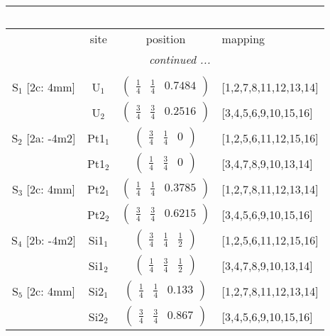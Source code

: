 \documentclass[fleqn,10pt,landscape]{article}
\begin{document}
\begin{itemize}
\begin{center}
\begin{longtable}{cc|c|l}
\multicolumn{3}{l}{\tablename\ \thetable{}} \\
 \hline \hline
 & site & position & mapping \\ \hline \endhead

 \hline \hline
\multicolumn{3}{r}{\footnotesize\it continued ...} \\ \endfoot

 \hline \hline
\multicolumn{3}{r}{} \\ \endlastfoot

S$_{1}$ [2c: 4mm] & U$_1$ & $\begin{pmatrix} \frac{1}{4} & \frac{1}{4} & 0.7484 \end{pmatrix}$ & [1,2,7,8,11,12,13,14] \\
& U$_2$ & $\begin{pmatrix} \frac{3}{4} & \frac{3}{4} & 0.2516 \end{pmatrix}$ & [3,4,5,6,9,10,15,16] \\ \hline
S$_{2}$ [2a: -4m2] & Pt1$_1$ & $\begin{pmatrix} \frac{3}{4} & \frac{1}{4} & 0 \end{pmatrix}$ & [1,2,5,6,11,12,15,16] \\
& Pt1$_2$ & $\begin{pmatrix} \frac{1}{4} & \frac{3}{4} & 0 \end{pmatrix}$ & [3,4,7,8,9,10,13,14] \\ \hline
S$_{3}$ [2c: 4mm] & Pt2$_1$ & $\begin{pmatrix} \frac{1}{4} & \frac{1}{4} & 0.3785 \end{pmatrix}$ & [1,2,7,8,11,12,13,14] \\
& Pt2$_2$ & $\begin{pmatrix} \frac{3}{4} & \frac{3}{4} & 0.6215 \end{pmatrix}$ & [3,4,5,6,9,10,15,16] \\ \hline
S$_{4}$ [2b: -4m2] & Si1$_1$ & $\begin{pmatrix} \frac{3}{4} & \frac{1}{4} & \frac{1}{2} \end{pmatrix}$ & [1,2,5,6,11,12,15,16] \\
& Si1$_2$ & $\begin{pmatrix} \frac{1}{4} & \frac{3}{4} & \frac{1}{2} \end{pmatrix}$ & [3,4,7,8,9,10,13,14] \\ \hline
S$_{5}$ [2c: 4mm] & Si2$_1$ & $\begin{pmatrix} \frac{1}{4} & \frac{1}{4} & 0.133 \end{pmatrix}$ & [1,2,7,8,11,12,13,14] \\
& Si2$_2$ & $\begin{pmatrix} \frac{3}{4} & \frac{3}{4} & 0.867 \end{pmatrix}$ & [3,4,5,6,9,10,15,16] \\
\end{longtable}
\end{center}


\end{itemize}
\end{document}
